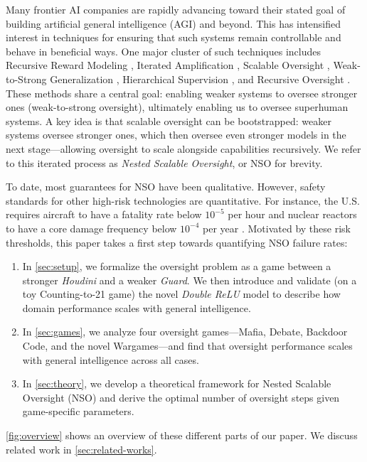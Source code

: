 \documentclass{article}
\begin{document}
Many frontier AI companies are rapidly advancing toward their stated goal of building artificial general intelligence (AGI) and beyond. This has intensified interest in techniques for ensuring that such systems remain controllable and behave in beneficial ways.
One major cluster of such techniques includes Recursive Reward Modeling \citep{leike2018scalable}, Iterated Amplification \citep{christiano2018supervising}, Scalable Oversight \citep{bowman2022measuring}, Weak-to-Strong Generalization \citep{burns2023weak}, Hierarchical Supervision \citep{shah2025approach}, and Recursive Oversight \citep{anthropic2025recommended}. These methods share a central goal: enabling weaker systems to oversee stronger ones (weak-to-strong oversight), ultimately enabling us to oversee superhuman systems.
A key idea is that scalable oversight can be bootstrapped: weaker systems oversee stronger ones, which then oversee even stronger models in the next stage—allowing oversight to scale alongside capabilities recursively. We refer to this iterated process as {\it Nested Scalable Oversight}, or NSO for brevity.

To date, most guarantees for NSO have been qualitative. However, safety standards for other high-risk technologies are quantitative. For instance, the U.S. requires aircraft to have a fatality rate below $10^{-5}$ per hour \citep{faa2023aviation} and nuclear reactors to have a core damage frequency below $10^{-4}$ per year \citep{nrc2001safety}. Motivated by these risk thresholds, this paper takes a first step towards quantifying NSO failure rates:
\begin{enumerate}[align=left,leftmargin=*]
    \item In \cref{sec:setup}, we formalize the oversight problem as a game between a stronger \textit{Houdini} and a weaker \textit{Guard}. We then introduce and validate (on a toy Counting-to-21 game) the novel \emph{Double ReLU} model to describe how domain performance scales with general intelligence.
    \item In \cref{sec:games}, we analyze four oversight games—Mafia, Debate, Backdoor Code, and the novel Wargames—and find that oversight performance scales with general intelligence across all cases.
    \item In \cref{sec:theory}, we develop a theoretical framework for Nested Scalable Oversight (NSO) and derive the optimal number of oversight steps given game-specific parameters.
\end{enumerate}
\cref{fig:overview} shows an overview of these different parts of our paper. We discuss related work in \cref{sec:related-works}.
\end{document}
